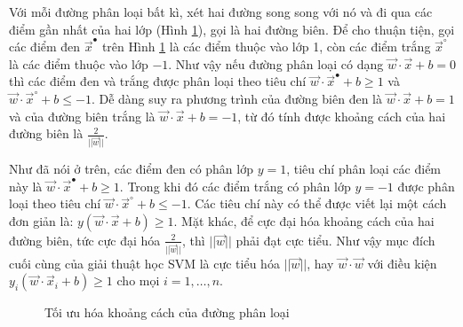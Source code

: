 Với mỗi đường phân loại bất kì, xét hai đường song song với nó và đi qua các điểm gần nhất của hai lớp (Hình \ref{optimal-sep}), gọi là hai đường biên. Để cho thuận tiện, gọi các điểm đen $\vec{x}^\bullet$ trên Hình \ref{optimal-sep} là các điểm thuộc vào lớp 1, còn các điểm trắng $\vec{x}^\circ$ là các điểm thuộc vào lớp $-1$. Như vậy nếu đường phân loại có dạng $\vec{w}\cdot\vec{x}+b=0$ thì các điểm đen và trắng được phân loại theo tiêu chí $\vec{w}\cdot\vec{x}^\bullet+b\geq1$ và $\vec{w}\cdot\vec{x}^\circ+b\leq-1$. Dễ dàng suy ra phương trình của đường biên đen là $\vec{w}\cdot\vec{x}+b=1$ và của đường biên trắng là $\vec{w}\cdot\vec{x}+b=-1$, từ đó tính được khoảng cách của hai đường biên là $\frac{2}{||\vec{w}||}$.

Như đã nói ở trên, các điểm đen có phân lớp $y=1$, tiêu chí phân loại các điểm này là $\vec{w}\cdot\vec{x}^\bullet+b\geq1$. Trong khi đó các điểm trắng có phân lớp $y=-1$ được phân loại theo tiêu chí $\vec{w}\cdot\vec{x}^\circ+b\leq-1$. Các tiêu chí này có thể được viết lại một cách đơn giản là: $y(\vec{w}\cdot\vec{x}+b)\geq1$. Mặt khác, để cực đại hóa khoảng cách của hai đường biên, tức cực đại hóa $\frac{2}{||\vec{w}||}$, thì $||\vec{w}||$ phải đạt cực tiểu. Như vậy mục đích cuối cùng của giải thuật học SVM là cực tiểu hóa $||\vec{w}||$, hay $\vec{w}\cdot\vec{w}$ với điều kiện $y_i(\vec{w}\cdot\vec{x}_i+b)\geq1$ cho mọi $i=1,\dots,n$.

\begin{figure}[ht]
\centering
{}
\caption{Tối ưu hóa khoảng cách của đường phân loại\label{optimal-sep}}
\end{figure}

